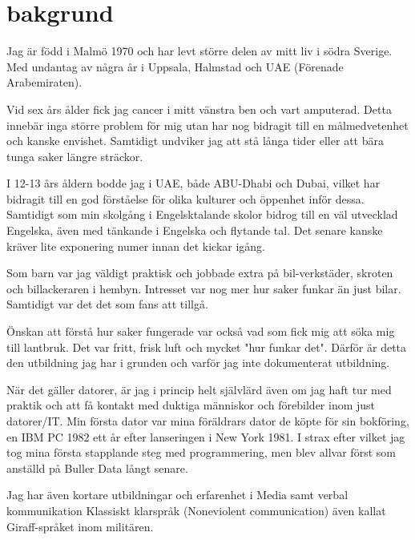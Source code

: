 \documentclass[]{cv-style}          %
\begin{document}

\section{bakgrund}
Jag är född i Malmö 1970 och har levt större delen av mitt liv i södra Sverige.
Med undantag av några år i Uppsala, Halmstad och UAE (Förenade Arabemiraten).

Vid sex års ålder fick jag cancer i mitt vänstra ben och vart amputerad. Detta
innebär inga större problem för mig utan har nog bidragit till en målmedvetenhet
och kanske envishet. Samtidigt undviker jag att stå långa tider eller att bära
tunga saker längre sträckor.

I 12-13 års åldern bodde jag i UAE, både ABU-Dhabi och Dubai, vilket har
bidragit till en god förståelse för olika kulturer och öppenhet inför dessa.
Samtidigt som min skolgång i Engelsktalande skolor bidrog till en väl utvecklad
Engelska, även med tänkande i Engelska och flytande tal. Det senare kanske
kräver lite exponering numer innan det kickar igång.

Som barn var jag väldigt praktisk och jobbade extra på bil-verkstäder, skroten
och billackeraren i hembyn. Intresset var nog mer hur saker funkar än just
bilar. Samtidigt var det det som fans att tillgå.

Önskan att förstå hur saker fungerade var också vad som fick mig att söka
mig till lantbruk. Det var fritt, frisk luft och mycket "hur funkar det".
Därför är detta den utbildning jag har i grunden och varför jag inte 
dokumenterat utbildning.

När det gäller datorer, är jag i princip helt självlärd även om jag haft
tur med praktik och att få kontakt med duktiga människor och förebilder
inom just datorer/IT. Min första dator var mina föräldrars dator de köpte
för sin bokföring, en IBM PC 1982 ett år efter lanseringen i New York 1981.
I strax efter vilket jag tog mina första stapplande steg med programmering,
men blev allvar först som anställd på Buller Data långt senare.

Jag har även kortare utbildningar och erfarenhet i Media samt verbal 
kommunikation Klassiskt klarspråk (Noneviolent communication) även kallat
Giraff-språket inom militären.
\end{document}
